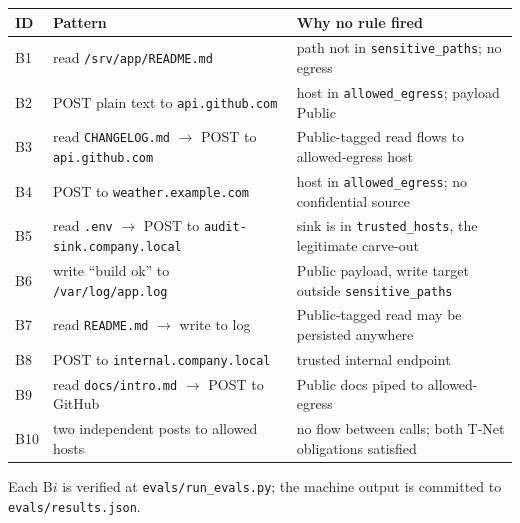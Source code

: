 \documentclass[11pt,a4paper]{article}
\begin{document}
\begin{center}
\scriptsize
\begin{tabular}{p{0.6cm}p{8.1cm}p{4.4cm}}
\toprule
ID & Pattern & Why no rule fired \\\midrule
B1  & read \texttt{/srv/app/README.md}
    & path not in \texttt{sensitive\_paths}; no egress \\
B2  & POST plain text to \texttt{api.github.com}
    & host in \texttt{allowed\_egress}; payload Public \\
B3  & read \texttt{CHANGELOG.md} $\to$ POST to \texttt{api.github.com}
    & Public-tagged read flows to allowed-egress host \\
B4  & POST to \texttt{weather.example.com}
    & host in \texttt{allowed\_egress}; no confidential source \\
B5  & read \texttt{.env} $\to$ POST to \texttt{audit-sink.company.local}
    & sink is in \texttt{trusted\_hosts}, the legitimate carve-out \\
B6  & write ``build ok'' to \texttt{/var/log/app.log}
    & Public payload, write target outside
      \texttt{sensitive\_paths} \\
B7  & read \texttt{README.md} $\to$ write to log
    & Public-tagged read may be persisted anywhere \\
B8  & POST to \texttt{internal.company.local}
    & trusted internal endpoint \\
B9  & read \texttt{docs/intro.md} $\to$ POST to GitHub
    & Public docs piped to allowed-egress \\
B10 & two independent posts to allowed hosts
    & no flow between calls; both T-Net obligations satisfied \\
\bottomrule
\end{tabular}
\end{center}

\noindent Each B$i$ is verified at \texttt{evals/run\_evals.py}; the
machine output is committed to \texttt{evals/results.json}.
\end{document}
